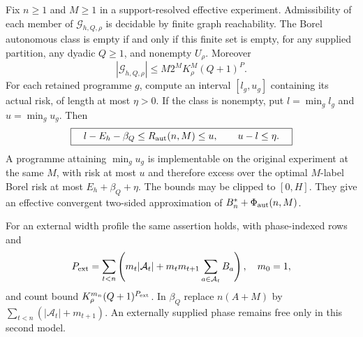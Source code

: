 \begin{theorem}\label{thm:effective}
Fix $n\ge1$ and $M\ge1$ in a support-resolved effective experiment. Admissibility of each member of $\mathscr G_{h,Q,\rho}$ is decidable by finite graph reachability. The Borel autonomous class is empty if and only if this finite set is empty, for any supplied partition, any dyadic $Q\ge1$, and nonempty $U_\rho$. Moreover
\begin{equation}\label{eq:programme_count}
 |\mathscr G_{h,Q,\rho}|\le
 M2^M K_\rho^M(Q+1)^P.
\end{equation}
For each retained programme $g$, compute an interval $[l_g,u_g]$ containing its actual risk, of length at most $\eta>0$. If the class is nonempty, put $l=\min_g l_g$ and $u=\min_g u_g$. Then
\begin{equation}\label{eq:effective_interval}
 \boxed{\quad l-E_h-\beta_Q\le R_{\mathrm{aut}}(n,M)\le u,\qquad
 u-l\le\eta.\quad}
\end{equation}
A programme attaining $\min_g u_g$ is implementable on the original experiment at the same $M$, with risk at most $u$ and therefore excess over the optimal $M$-label Borel risk at most $E_h+\beta_Q+\eta$. The bounds may be clipped to $[0,H]$. They give an effective convergent two-sided approximation of $B_n^*+\Phi_{\mathrm{aut}}(n,M)$.

For an external width profile the same assertion holds, with phase-indexed rows and
\begin{equation}\label{eq:effective_external}
 P_{\mathrm{ext}}=\sum_{t<n}\left(m_t|\mathcal A_t|
                  +m_tm_{t+1}\sum_{a\in\mathcal A_t}B_a\right),\quad m_0=1,
\end{equation}
and count bound $K_\rho^{m_n}(Q+1)^{P_{\mathrm{ext}}}$. In $\beta_Q$ replace $n(A+M)$ by $\sum_{t<n}(|\mathcal A_t|+m_{t+1})$. An externally supplied phase remains free only in this second model.
\end{theorem}

